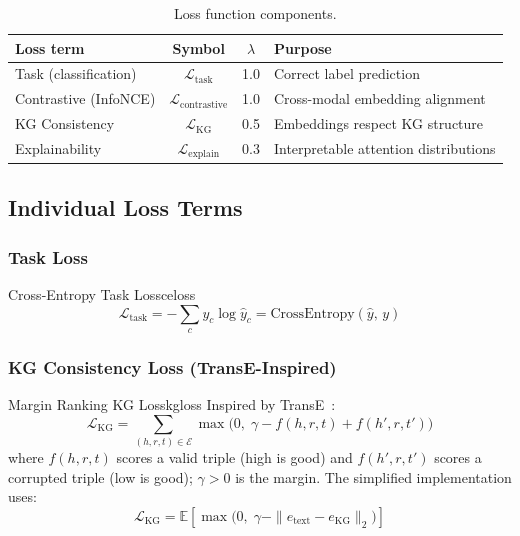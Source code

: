 \documentclass[12pt,a4paper]{article}
\newcommand{\kgE}{\mathcal{E}}
\begin{document}
\begin{table}[H]
\centering
\caption{Loss function components.}
\begin{tabular}{lccp{5.5cm}}
\toprule
\textbf{Loss term} & \textbf{Symbol} & \textbf{$\lambda$} & \textbf{Purpose} \\
\midrule
Task (classification) & $\mathcal{L}_\text{task}$ & 1.0 &
  Correct label prediction \\
Contrastive (InfoNCE) & $\mathcal{L}_\text{contrastive}$ & 1.0 &
  Cross-modal embedding alignment \\
KG Consistency & $\mathcal{L}_\text{KG}$ & 0.5 &
  Embeddings respect KG structure \\
Explainability & $\mathcal{L}_\text{explain}$ & 0.3 &
  Interpretable attention distributions \\
\bottomrule
\end{tabular}
\end{table}

\subsection{Individual Loss Terms}

\subsubsection{Task Loss}

\begin{definition}{Cross-Entropy Task Loss}{celoss}
\[
  \mathcal{L}_\text{task}
  = -\sum_{c} y_c \log \hat{y}_c
  = \text{CrossEntropy}(\hat{y},\, y)
\]
\end{definition}

\subsubsection{KG Consistency Loss (TransE-Inspired)}

\begin{definition}{Margin Ranking KG Loss}{kgloss}
Inspired by TransE~\cite{transe}:
\[
  \mathcal{L}_\text{KG}
  = \sum_{(h,r,t)\in\kgE}
    \max\!\bigl(0,\;\gamma - f(h,r,t) + f(h',r,t')\bigr)
\]
where $f(h,r,t)$ scores a valid triple (high is good) and $f(h',r,t')$ scores a
corrupted triple (low is good); $\gamma > 0$ is the margin.
The simplified implementation uses:
\[
  \mathcal{L}_\text{KG}
  = \mathbb{E}\!\left[\max\!\bigl(0,\;
    \gamma - \|e_\text{text} - e_\text{KG}\|_2\bigr)\right]
\]
\end{definition}
\end{document}
